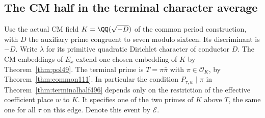 \documentclass[a4paper,11pt]{article}
\theoremstyle{definition}
\theoremstyle{remark}
\numberwithin{equation}{section}
\begin{document}
\subsection{The CM half in the terminal character average}
\label{sec:cmaverage508}

Use the actual CM field \(K=\QQ(\sqrt{-D})\) of the common period
construction, with \(D\) the auxiliary prime congruent to seven
modulo sixteen. Its discriminant is \(-D\). Write \(\lambda\)
for its primitive quadratic Dirichlet character of conductor \(D\).
The CM embeddings of \(E_x\) extend one chosen embedding of \(K\)
by Theorem~\ref{thm:pol49}. The terminal prime is \(T=\pi\bar\pi\)
with \(\pi\in\mathcal O_K\), by Theorem~\ref{thm:common111}.
In particular the condition \(P_{\tau,w}\mid\pi\) in
Theorem~\ref{thm:terminalhalf496} depends only on the restriction
of the effective coefficient place \(w\) to \(K\). It specifies
one of the two primes of \(K\) above \(T\), the same one for
all \(\tau\) on this edge. Denote this event by \(\mathcal E\).
\end{document}
